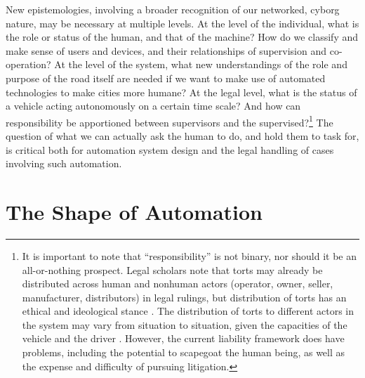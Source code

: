 New epistemologies, involving a broader recognition of our
networked, 
cyborg nature, may be
necessary at multiple levels. At the level of the individual, what is
the role or status of the human, and that of the machine? How do we
classify and make sense of users and devices, and their
relationships of supervision and co-operation? At the level of the
system, what new understandings of the role and purpose of the road
itself are needed if we want to make use of automated technologies to
make cities more humane? At the legal level, what is the status of a
vehicle acting autonomously on a certain time scale? And how can
responsibility be apportioned between supervisors and the
supervised?\footnote{It is important to note that ``responsibility''
  is not binary, nor 
should it be an all-or-nothing prospect. Legal scholars note that
torts may already be distributed across human and nonhuman actors
(operator, owner, seller, manufacturer, distributors) in legal
rulings, but distribution of torts has an ethical
and ideological stance \cite{suemycar} \cite{proximityLiability}. The distribution of
torts to different actors in the system may vary from situation to
situation, given the capacities of 
the vehicle and the driver \cite[p. 267]{suemycar}. However,
the current liability framework does have problems, including the
potential to scapegoat the human being, as well as the expense and difficulty
of pursuing litigation.}
The question of what we can actually ask the human to do, and hold them to task
for, is critical both for automation system design and the
legal handling of cases involving such automation.


\section{The Shape of Automation}

